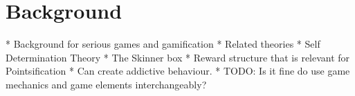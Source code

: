 \section{Background}
* Background for serious games and gamification
* Related theories
    * Self Determination Theory
    * The Skinner box
        * Reward structure that is relevant for Pointsification
        * Can create addictive behaviour. 
* TODO: Is it fine do use game mechanics and game elements interchangeably? 